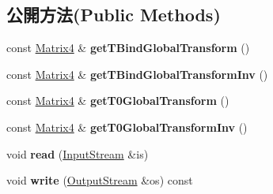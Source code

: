 \subsection*{公開方法(Public Methods)}
\begin{DoxyCompactItemize}
\item 
const \hyperlink{class_magnum_1_1_matrix4}{Matrix4} \& {\bfseries get\+T\+Bind\+Global\+Transform} ()\hypertarget{class_magnum_1_1endif_1_1_bone_aff4e24545630380157c0bb3646d66f94}{}\label{class_magnum_1_1endif_1_1_bone_aff4e24545630380157c0bb3646d66f94}

\item 
const \hyperlink{class_magnum_1_1_matrix4}{Matrix4} \& {\bfseries get\+T\+Bind\+Global\+Transform\+Inv} ()\hypertarget{class_magnum_1_1endif_1_1_bone_aabd124c07bc3812e470e4387b1f16473}{}\label{class_magnum_1_1endif_1_1_bone_aabd124c07bc3812e470e4387b1f16473}

\item 
const \hyperlink{class_magnum_1_1_matrix4}{Matrix4} \& {\bfseries get\+T0\+Global\+Transform} ()\hypertarget{class_magnum_1_1endif_1_1_bone_aa35ca820467520bda37289798641ef75}{}\label{class_magnum_1_1endif_1_1_bone_aa35ca820467520bda37289798641ef75}

\item 
const \hyperlink{class_magnum_1_1_matrix4}{Matrix4} \& {\bfseries get\+T0\+Global\+Transform\+Inv} ()\hypertarget{class_magnum_1_1endif_1_1_bone_a91b12ecda4190e9c40feb30ee4cfffaf}{}\label{class_magnum_1_1endif_1_1_bone_a91b12ecda4190e9c40feb30ee4cfffaf}

\item 
void {\bfseries read} (\hyperlink{class_magnum_1_1_input_stream}{Input\+Stream} \&is)\hypertarget{class_magnum_1_1endif_1_1_bone_adb16f2eef47381322911de1ece35ecd0}{}\label{class_magnum_1_1endif_1_1_bone_adb16f2eef47381322911de1ece35ecd0}

\item 
void {\bfseries write} (\hyperlink{class_magnum_1_1_output_stream}{Output\+Stream} \&os) const \hypertarget{class_magnum_1_1endif_1_1_bone_a1083c42196d24a385a7e8695eb51300f}{}\label{class_magnum_1_1endif_1_1_bone_a1083c42196d24a385a7e8695eb51300f}

\end{DoxyCompactItemize}
